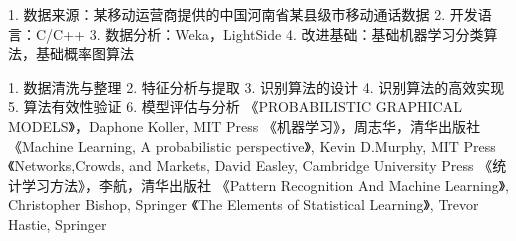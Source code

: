\assignReq
{1. 数据来源：某移动运营商提供的中国河南省某县级市移动通话数据}
{2. 开发语言：C/C++}
{3. 数据分析：Weka，LightSide}
{4. 改进基础：基础机器学习分类算法，基础概率图算法}

\assignWork
{1. 数据清洗与整理}
{2. 特征分析与提取}
{3. 识别算法的设计}
{4. 识别算法的高效实现}
{5. 算法有效性验证}
{6. 模型评估与分析}
\assignRef
{《PROBABILISTIC GRAPHICAL MODELS》，Daphone Koller, MIT Press}
{《机器学习》，周志华，清华出版社}
{《Machine Learning, A probabilistic perspective》, Kevin D.Murphy, MIT Press}
{《Networks,Crowds, and Markets, David Easley, Cambridge University Press}
{《统计学习方法》，李航，清华出版社}
{《Pattern Recognition And Machine Learning》, Christopher Bishop, Springer}
{《The Elements of Statistical Learning》, Trevor Hastie, Springer}

